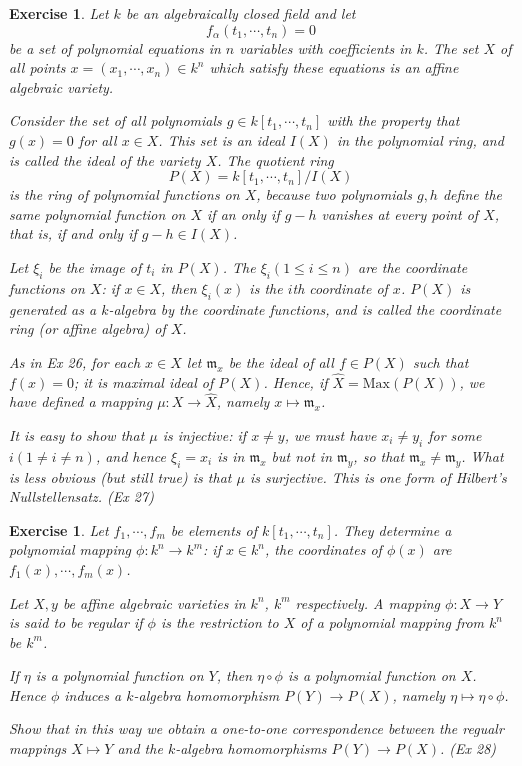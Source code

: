 \documentclass[]{report}
\newtheorem{exercise}[theorem]{Exercise}
\begin{document}
\begin{exercise}
    Let $k$ be an algebraically closed field and let
        $$f_\alpha(t_1,\cdots,t_n) = 0$$
    be a set of polynomial equations in $n$ variables with coefficients in $k$. The set $X$ of all points $x = (x_1,\cdots,x_n)\in k^n$ which satisfy these equations is an affine algebraic variety.

    Consider the set of all polynomials $g\in k[t_1,\cdots,t_n]$ with the property that $g(x) = 0$ for all $x\in X$. This set is an ideal $I(X)$ in the polynomial ring, and is called the ideal of the variety $X$. The quotient ring
        $$P(X) = k[t_1,\cdots,t_n]/I(X)$$
    is the ring of polynomial functions on $X$, because two polynomials $g, h$ define the same polynomial function on $X$ if an only if $g-h$ vanishes at every point of $X$, that is, if and only if $g-h\in I(X)$.

    Let $\xi_i$ be the image of $t_i$ in $P(X)$. The $\xi_i (1\leq i \leq n)$ are the coordinate functions on $X$: if $x\in X$, then $\xi_i(x)$ is the $i$th coordinate of $x$. $P(X)$ is generated as a $k$-algebra by the coordinate functions, and is called the coordinate ring (or affine algebra) of $X$.

    As in Ex 26, for each $x\in X$ let $\mathfrak{m}_x$ be the ideal of all $f\in P(X)$ such that $f(x) = 0$; it is maximal ideal of $P(X)$. Hence, if $\hat{X} = \text{Max}(P(X))$, we have defined a mapping $\mu: X\rightarrow \hat{X}$, namely $x\mapsto \mathfrak{m}_x$.

    It is easy to show that $\mu$ is injective: if $x\neq y$, we must have $x_i \neq y_i$ for some $i(1\neq i\neq n)$, and hence $\xi_i = x_i$ is in $\mathfrak{m}_x$ but not in $\mathfrak{m}_y$, so that $\mathfrak{m}_x \neq \mathfrak{m}_y$. What is less obvious (but still true) is that $\mu$ is surjective. This is one form of Hilbert's Nullstellensatz.
    (Ex 27)
\end{exercise}

\begin{exercise}
    Let $f_1,\cdots,f_m$ be elements of $k[t_1,\cdots,t_n]$. They determine a polynomial mapping $\phi: k^n\rightarrow k^m$: if $x\in k^n$, the coordinates of $\phi(x)$ are $f_1(x),\cdots,f_m(x)$.

    Let $X,y$ be affine algebraic varieties in $k^n$, $k^m$ respectively. A mapping $\phi: X\rightarrow Y$ is said to be regular if $\phi$ is the restriction to $X$ of a polynomial mapping from $k^n$ be $k^m$.

    If $\eta$ is a polynomial function on $Y$, then $\eta \circ \phi$ is a polynomial function on $X$. Hence $\phi$ induces a $k$-algebra homomorphism $P(Y)\rightarrow P(X)$, namely $\eta \mapsto \eta \circ \phi$.

    Show that in this way we obtain a one-to-one correspondence between the regualr mappings $X\mapsto Y$ and the $k$-algebra homomorphisms $P(Y) \rightarrow P(X)$.
    (Ex 28)
\end{exercise}
    
\end{document}
